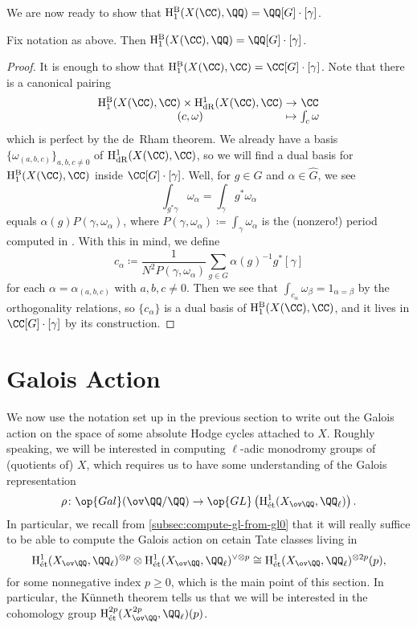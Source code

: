 \documentclass[../thesis.tex]{subfiles}
\begin{document}
We are now ready to show that $\mathrm H_1^{\mathrm B}(X(\CC),\QQ)=\QQ[G]\cdot[\gamma]$.
\begin{lemma}
	Fix notation as above. Then $\mathrm H_1^{\mathrm B}(X(\CC),\QQ)=\QQ[G]\cdot[\gamma]$.
\end{lemma}
\begin{proof}
	It is enough to show that $\mathrm H_1^{\mathrm B}(X(\CC),\CC)=\CC[G]\cdot[\gamma]$. Note that there is a canonical pairing
	\[\arraycolsep=1.4pt\begin{array}{ccc}
		\mathrm H_1^{\mathrm B}(X(\CC),\CC) \times \mathrm H^1_{\mathrm{dR}}(X(\CC),\CC) &\to& \CC \\
		(c,\omega) &\mapsto& \int_c\omega
	\end{array}\]
	which is perfect by the de~Rham theorem. We already have a basis $\{\omega_{(a,b,c)}\}_{a,b,c\ne0}$ of $\mathrm H^1_{\mathrm{dR}}(X(\CC),\CC)$, so we will find a dual basis for $\mathrm H_1^{\mathrm B}(X(\CC),\CC)$ inside $\CC[G]\cdot[\gamma]$. Well, for $g\in G$ and $\alpha\in\widehat G$, we see
	\[\int_{g^*\gamma}\omega_\alpha=\int_{\gamma}g^*\omega_\alpha\]
	equals $\alpha(g)P(\gamma,\omega_\alpha)$, where $P(\gamma,\omega_\alpha)\coloneqq\int_\gamma\omega_\alpha$ is the (nonzero!) period computed in . With this in mind, we define
	\[c_\alpha\coloneqq\frac1{N^2P(\gamma,\omega_\alpha)}\sum_{g\in G}\alpha(g)^{-1}g^*[\gamma]\]
	for each $\alpha=\alpha_{(a,b,c)}$ with $a,b,c\ne0$. Then we see that $\int_{c_\alpha}\omega_\beta=1_{\alpha=\beta}$ by the orthogonality relations, so $\{c_\alpha\}$ is a dual basis of $\mathrm H_1^{\mathrm B}(X(\CC),\CC)$, and it lives in $\CC[G]\cdot[\gamma]$ by its construction.
\end{proof}

\section{Galois Action} \label{sec:fermat-galois-action}
We now use the notation set up in the previous section to write out the Galois action on the space of some absolute Hodge cycles attached to $X$. Roughly speaking, we will be interested in computing $\ell$-adic monodromy groups of (quotients of) $X$, which requires us to have some understanding of the Galois representation
\[\rho\colon\op{Gal}(\ov\QQ/\QQ)\to\op{GL}\left(\mathrm H^1_{\mathrm{\acute et}}(X_{\ov\QQ},\QQ_\ell)\right).\]
In particular, we recall from \cref{subsec:compute-gl-from-gl0} that it will really suffice to be able to compute the Galois action on cetain Tate classes living in
\[\mathrm H^1_{\mathrm{\acute et}}(X_{\ov\QQ},\QQ_\ell)^{\otimes p}\otimes\mathrm H^1_{\mathrm{\acute et}}(X_{\ov\QQ},\QQ_\ell)^{\lor\otimes p}\cong\mathrm H^1_{\mathrm{\acute et}}(X_{\ov\QQ},\QQ_\ell)^{\otimes2p}(p),\]
for some nonnegative index $p\ge0$, which is the main point of this section. In particular, the K\"unneth theorem tells us that we will be interested in the cohomology group $\mathrm H^{2p}_{\mathrm{\acute et}}(X^{2p}_{\ov\QQ},\QQ_\ell)(p)$.
\end{document}
